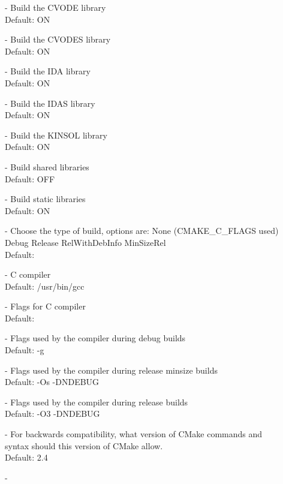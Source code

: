 \begin{description}
\item[] - 
  Build the CVODE library 
  \\
  Default: ON
\item[] - 
  Build the CVODES library 
  \\
  Default: ON
\item[] - 
   Build the IDA library 
  \\
   Default: ON
\item[] - 
  Build the IDAS library 
  \\
  Default: ON
\item[] - 
  Build the KINSOL library 
  \\
  Default: ON
\item[] - 
  Build shared libraries
  \\
  Default: OFF 
\item[] - 
  Build static libraries
  \\
  Default: ON 
\item[] -  
  Choose the type of build, options are: 
  None (CMAKE\_C\_FLAGS used) Debug Release RelWithDebInfo MinSizeRel
  \\
  Default:
\item[] - 
  C compiler
  \\
  Default: /usr/bin/gcc 
\item[] -  
  Flags for C compiler
  \\
  Default:
\item[] -      
  Flags used by the compiler during debug builds
  \\
  Default: -g 
\item[] -  
  Flags used by the compiler during release minsize builds
  \\
  Default: -Os -DNDEBUG 
\item[] -    
  Flags used by the compiler during release builds
  \\
  Default: -O3 -DNDEBUG 
\item[] - 
  For backwards compatibility, what version of CMake commands and
  syntax should this version of CMake allow.
  \\
  Default: 2.4
\item[] - 

\end{description}

